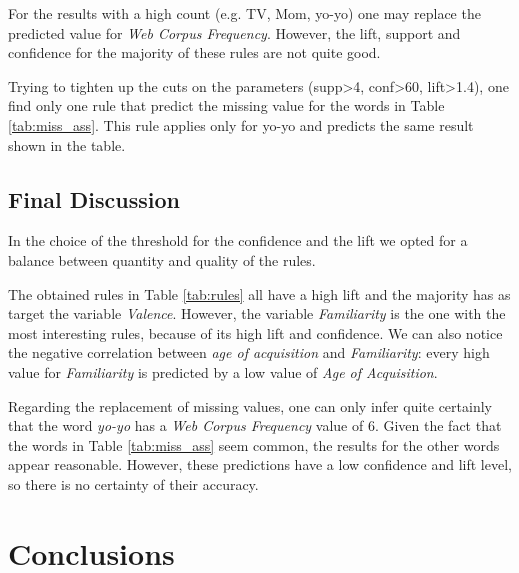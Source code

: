 \documentclass[a4paper,11pt,dvipsnames]{article}
\begin{document}
For the results with a high count (e.g. TV, Mom, yo-yo) one may replace the predicted value for \textit{Web Corpus Frequency}. However, the lift, support and confidence for the majority of these rules are not quite good.

Trying to tighten up the cuts on the parameters (supp>4, conf>60, lift>1.4), one find only one rule that predict the missing value for the words in Table \ref{tab:miss_ass}. This rule applies only for yo-yo and predicts the same result shown in the table.


\subsection{Final Discussion}

In the choice of the threshold for the confidence and the lift we opted for a balance between quantity and quality of the rules. 

The obtained rules in Table \ref{tab:rules} all have a high lift and the majority has as target the variable \textit{Valence}. However, the variable \textit{Familiarity} is the one with the most interesting rules, because of its high lift and confidence. We can also notice the negative correlation between \textit{age of acquisition} and \textit{Familiarity}: every high value for \textit{Familiarity} is predicted by a low value of \textit{Age of Acquisition}.

Regarding the replacement of missing values, one can only infer quite certainly that the word \textit{yo-yo} has a \textit{Web Corpus Frequency} value of 6. Given the fact that the words in Table \ref{tab:miss_ass} seem common, the results for the other words appear reasonable. However, these predictions have a low confidence and lift level, so there is no certainty of their accuracy.



\section{Conclusions}
\end{document}
